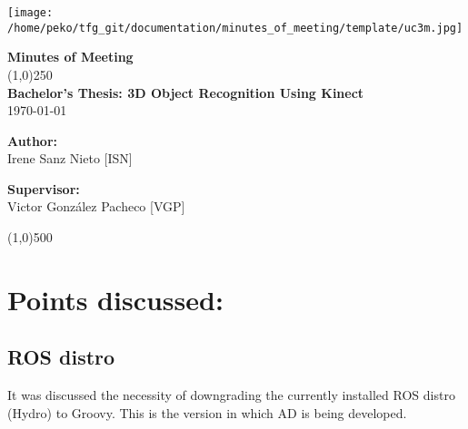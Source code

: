 \documentclass{article}
\newenvironment{myindentpar}[1]%
 {\begin{list}{}%
         {\setlength{\leftmargin}{#1}}%
         \item[]%
 }
 {\end{list}}
\begin{document}
\texttt{[image: /home/peko/tfg\_git/documentation/minutes\_of\_meeting/template/uc3m.jpg]}

\vspace{-1cm}
\begin{minipage}[b]{1\linewidth}
	\begin{center}
	{\Huge \bfseries{Minutes of Meeting}}\\
	\line(1,0){250}\\[1cm]
	{\LARGE \textbf{Bachelor's Thesis: 3D Object Recognition Using Kinect}}\\[0.5cm]
	{\large \today}
	\end{center}
\end {minipage}



\begin{minipage}{0.55\textwidth}
\begin{flushleft} \large
\textbf{{Author:}\\}
Irene Sanz Nieto [ISN]\\
\end{flushleft}
\end{minipage}
\begin{minipage}{0.4\textwidth}
\begin{flushright} \large
\textbf{Supervisor: }\\
Victor González Pacheco [VGP]
\end{flushright}\end{minipage}

\begin{center}
\line(1,0){500}
\end{center}

\renewcommand{\thesubsection}
{\hspace*{1cm} \arabic{section}.\arabic{subsection}}



\section{\LARGE Points discussed: }
	\subsection{ROS distro}
		\begin{myindentpar}{1cm} 
		It was discussed the necessity of downgrading the currently installed ROS distro (Hydro) to Groovy. This is the version in which AD is being developed.  
		\end{myindentpar}
		
\end{document}
